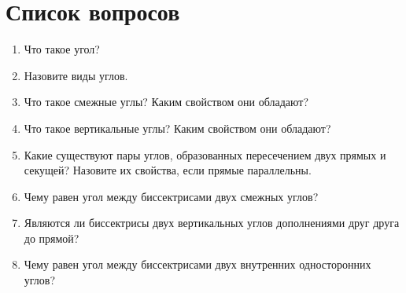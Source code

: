 \documentclass[12pt, a4paper]{article}
\begin{document}
		

\section{Список вопросов}
\begin{enumerate}
	\subsection{Углы}
	\item Что такое угол?
	\item Назовите виды углов.
	\item Что такое смежные углы? Каким свойством они обладают?
	\item Что такое вертикальные углы? Каким свойством они обладают?
	\item Какие существуют пары углов, образованных пересечением двух прямых и секущей? Назовите их свойства, если прямые параллельны.
	\item Чему равен угол между биссектрисами двух смежных углов?
	\item Являются ли биссектрисы двух вертикальных углов дополнениями друг друга до прямой?
	\item Чему равен угол между биссектрисами двух внутренних односторонних углов?

\end{enumerate}
\end{document}
